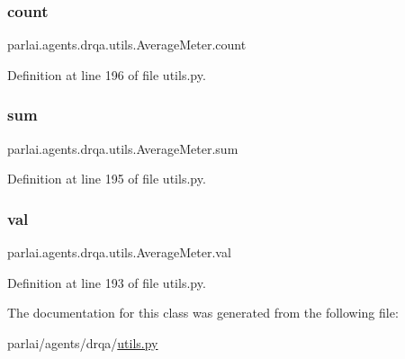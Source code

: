 \subsubsection{\texorpdfstring{count}{count}}
{\footnotesize\ttfamily parlai.\+agents.\+drqa.\+utils.\+Average\+Meter.\+count}



Definition at line 196 of file utils.\+py.

\mbox{\label{classparlai_1_1agents_1_1drqa_1_1utils_1_1AverageMeter_ab4cfd9c6c69772ef8828a14e3217508a}} 
\subsubsection{\texorpdfstring{sum}{sum}}
{\footnotesize\ttfamily parlai.\+agents.\+drqa.\+utils.\+Average\+Meter.\+sum}



Definition at line 195 of file utils.\+py.

\mbox{\label{classparlai_1_1agents_1_1drqa_1_1utils_1_1AverageMeter_a0b98a68fd8e5d78852462e6ab3822760}} 
\subsubsection{\texorpdfstring{val}{val}}
{\footnotesize\ttfamily parlai.\+agents.\+drqa.\+utils.\+Average\+Meter.\+val}



Definition at line 193 of file utils.\+py.



The documentation for this class was generated from the following file\+:\begin{DoxyCompactItemize}
\item 
parlai/agents/drqa/\hyperlink{parlai_2agents_2drqa_2utils_8py}{utils.\+py}\end{DoxyCompactItemize}
